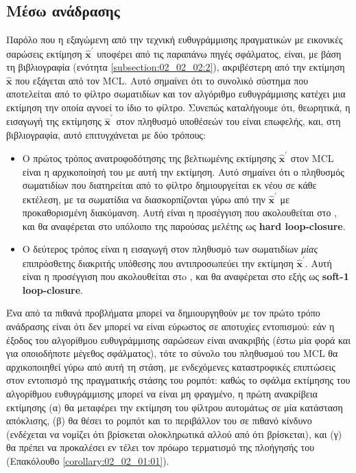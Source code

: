 \subsection{Μέσω ανάδρασης}
\label{subsection:02_02_03:03}

Παρόλο που η εξαγώμενη από την τεχνική ευθυγράμμισης πραγματικών με εικονικές
σαρώσεις εκτίμηση $\hat{\bm{x}}^{\prime}$ υποφέρει από τις παραπάνω πηγές
σφάλματος, είναι, με βάση τη βιβλιογραφία (ενότητα
\ref{subsection:02_02_02:2}), ακριβέστερη από την εκτίμηση
$\bm{\hat{x}}$ που εξάγεται από τον MCL. Αυτό σημαίνει ότι το συνολικό σύστημα
που αποτελείται από το φίλτρο σωματιδίων και τον αλγόριθμο ευθυγράμμισης
κατέχει μια εκτίμηση την οποία αγνοεί το ίδιο το φίλτρο. Συνεπώς καταλήγουμε
ότι, θεωρητικά, η εισαγωγή της εκτίμησης $\hat{\bm{x}}^{\prime}$ στον πληθυσμό
υποθέσεών του είναι επωφελής, και, στη βιβλιογραφία, αυτό επιτυγχάνεται με δύο
τρόπους:

\begin{itemize}
  \item Ο πρώτος τρόπος ανατροφοδότησης της βελτιωμένης εκτίμησης
        $\hat{\bm{x}}^{\prime}$ στον MCL είναι η αρχικοποίησή του με αυτή
        την εκτίμηση. Αυτό σημαίνει ότι ο πληθυσμός σωματιδίων που διατηρείται
        από το φίλτρο δημιουργείται εκ νέου σε κάθε εκτέλεση, με τα σωματίδια
        να διασκορπίζονται γύρω από την $\hat{\bm{x}}^{\prime}$ με
        προκαθορισμένη διακύμανση. Αυτή είναι η προσέγγιση που ακολουθείται στο
        \cite{Vasiljevic2016a}, και θα αναφέρεται στο υπόλοιπο της παρούσας
        μελέτης ως \textbf{hard loop-closure}.
  \item Ο δεύτερος τρόπος είναι η εισαγωγή στον πληθυσμό των σωματιδίων
         \textit{μίας} επιπρόσθετης διακριτής υπόθεσης που αντιπροσωπεύει την
         εκτίμηση $\hat{\bm{x}}^{\prime}$. Αυτή είναι η προσέγγιση που
         ακολουθείται στo \cite{Peng2018a}, και θα αναφέρεται στο εξής ως
         \textbf{soft-1 loop-closure}.
\end{itemize}

Ένα από τα πιθανά προβλήματα μπορεί να δημιουργηθούν με τον πρώτο τρόπο
ανάδρασης είναι ότι δεν μπορεί να είναι εύρωστος σε αποτυχίες εντοπισμού: εάν η
έξοδος του αλγορίθμου ευθυγράμμισης σαρώσεων είναι ανακριβής (έστω μία φορά και
για οποιοδήποτε μέγεθος σφάλματος), τότε το σύνολο του πληθυσμού του MCL θα
αρχικοποιηθεί γύρω από αυτή τη στάση, με ενδεχόμενες καταστροφικές επιπτώσεις
στον εντοπισμό της πραγματικής στάσης του ρομπότ: καθώς το σφάλμα εκτίμησης του
αλγορίθμου ευθυγράμμισης μπορεί να είναι μη φραγμένο, η πρώτη ανακρίβεια
εκτίμησης (α) θα μεταφέρει την εκτίμηση του φίλτρου αυτομάτως σε μία κατάσταση
απόκλισης, (β) θα θέσει το ρομπότ και το περιβάλλον του σε πιθανό κίνδυνο
(ενδέχεται να νομίζει ότι βρίσκεται ολοκληρωτικά αλλού από ότι βρίσκεται), και
(γ) θα πρέπει να προκαλέσει εν τέλει τον πρόωρο τερματισμό της πλοήγησής του
(Επακόλουθο \ref{corollary:02_02_01:01}).

